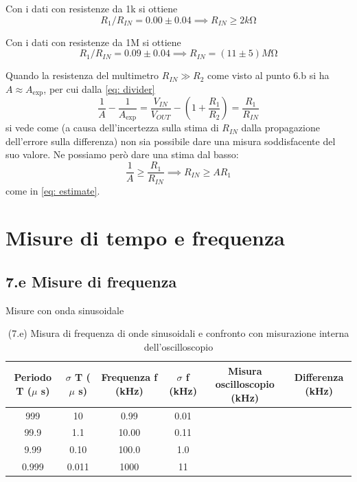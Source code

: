 \documentclass[10pt,a4paper]{article}
\newcommand{\exn}{\phantom{xxx}}
\begin{document}
Con i dati con resistenze da 1k si ottiene
\begin{equation}\label{eq: estimate}
R_1/R_{IN} = 0.00  \pm  0.04   \implies  R_{IN} \geq 2 \si{k\ohm}
\end{equation}


Con i dati con resistenze da 1M si ottiene
\[ R_1/R_{IN} = 0.09  \pm  0.04   \implies  R_{IN} = (11 \pm  5) \si{M\ohm}
\]

Quando la resistenza del multimetro $R_{IN} \gg R_2$ come visto al punto
6.b si ha $A \approx A_{\exp}$, per cui dalla \eqref{eq: divider}
\[
\frac{1}{A} - \frac{1}{A_{\exp}} = \frac{V_{IN}}{V_{OUT}} -
(1 +  \frac{R_1}{R_2}) = \frac{R_1}{R_{IN}}
\]
si vede come (a causa dell'incertezza sulla stima di $R_{IN}$ dalla
propagazione dell'errore sulla differenza) non sia possibile dare una misura
soddisfacente del suo valore. Ne possiamo però dare una stima dal basso:
\[
\frac{1}{A} \geq \frac{R_1}{R_{IN}} \implies R_{IN} \geq A R_1
\]
come in \eqref{eq: estimate}.

\section{Misure di tempo e frequenza}

\subsection*{7.e Misure di frequenza}
Misure con onda sinusoidale
\begin{table}[h]
\centering
\begin{tabular}{|c|c|c|c|c|c|}
\hline 
Periodo T ($\mu$ s)& $\sigma$ T ($\mu$ s) &Frequenza f (kHz) & $\sigma$ f (kHz) &
Misura oscilloscopio (kHz) & Differenza (kHz)\\
\hline 
999 & 10 & 0.99 & 0.01 & \exn &\exn \\
99.9 & 1.1 & 10.00 & 0.11 & \exn &\exn \\
9.99 & 0.10 & 100.0 & 1.0 & \exn &\exn \\
0.999 & 0.011 & 1000 & 11 & \exn &\exn \\
\hline 
\end{tabular} 
\caption{(7.e) Misura di frequenza di onde sinusoidali e confronto con
misurazione interna dell'oscilloscopio }
\end{table}
\end{document}
